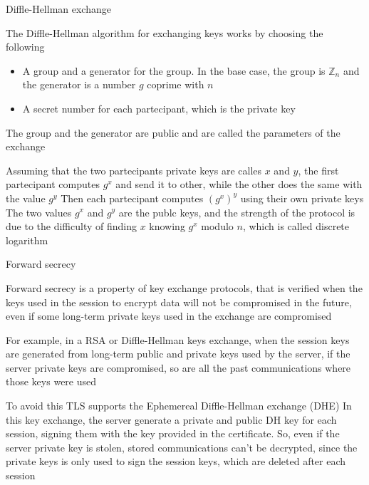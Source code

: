 \begin{frame}{Diffle-Hellman exchange}
	
The Diffle-Hellman algorithm for exchanging keys works by choosing the following 

\begin{itemize}
	\item A group and a generator for the group. In the base case, the group is $\mathbb{Z}_n$ and the generator is a number $g$ coprime with $n$
	\item A secret number for each partecipant, which is the private key
\end{itemize}

The group and the generator are public and are called the parameters of the exchange

Assuming that the two partecipants private keys are calles $x$ and $y$, the first partecipant computes $g^x$ and send it to other, while the other does the same with the value $g^y$
\newline
Then each partecipant computes $(g^x)^y$ using their own private keys
\newline
The two values $g^x$ and $g^y$ are the publc keys, and the strength of the protocol is due to the difficulty of finding $x$ knowing $g^x$ modulo $n$, which is called discrete logarithm
	
\end{frame}

\begin{frame}{Forward secrecy}
	
Forward secrecy is a property of key exchange protocols, that is verified when the keys used in the session to encrypt data will not be compromised in the future, even if some long-term private keys used in the exchange are compromised

For example, in a RSA or Diffle-Hellman keys exchange, when the session keys are generated from long-term public and private keys used by the server, if the server private keys are compromised, so are all the past communications where those keys were used

To avoid this TLS supports the Ephemereal Diffle-Hellman exchange (DHE) \newline
In this key exchange, the server generate a private and public DH key for each session, signing them with the key provided in the certificate. So, even if the server private key is stolen, stored communications can't be decrypted, since the private keys is only used to sign the session keys, which are deleted after each session
	
\end{frame}